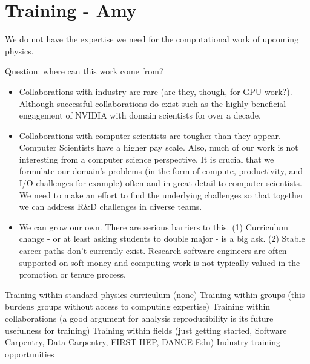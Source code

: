 \section{Training - Amy}

We do not have the expertise we need for the computational work of upcoming physics.

Question: where can this work come from?

\begin{itemize}
\item Collaborations with industry are rare (are they, though, for GPU work?).  Although successful collaborations do exist such as the highly beneficial engagement of NVIDIA with domain scientists for over a decade. 
\item Collaborations with computer scientists are tougher than they appear.  Computer Scientists have a higher pay scale.  Also, much of our work is not interesting from a computer science perspective. It is crucial that we formulate our domain's problems (in the form of compute, productivity, and I/O challenges for example) often and in great detail to computer scientists. We need to make an effort to find the underlying challenges so that together we can address R\&D challenges in diverse teams. 
\item We can grow our own.  There are serious barriers to this.  (1) Curriculum change - or at least asking students to double major - is a big ask.  (2) Stable career paths don't currently exist.  Research software engineers are often supported on soft money and computing work is not typically valued in the promotion or tenure process.
\end{itemize}

Training within standard physics curriculum (none)
Training within groups (this burdens groups without access to computing expertise)
Training within collaborations (a good argument for analysis reproducibility is its future usefulness for training)
Training within fields (just getting started, Software Carpentry, Data Carpentry, FIRST-HEP, DANCE-Edu)
Industry training opportunities

